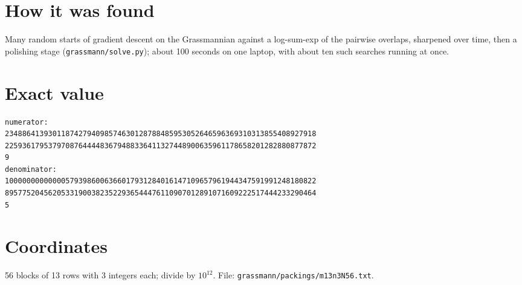 \documentclass[11pt,a4paper]{article}
\begin{document}
\section{How it was found}
Many random starts of gradient descent on the Grassmannian against a log-sum-exp of the pairwise overlaps, sharpened over time, then a polishing stage (\texttt{grassmann/solve.py}); about 100 seconds on one laptop, with about ten such searches running at once.


\appendix
\section{Exact value}
{\small
\begin{verbatim}
numerator:
234886413930118742794098574630128788485953052646596369310313855408927918
225936179537970876444483679488336411327448900635961178658201282880877872
9
denominator:
100000000000005793986006366017931284016147109657961944347591991248180822
895775204562053319003823522936544476110907012891071609222517444233290464
5
\end{verbatim}}

\section{Coordinates}
56 blocks of 13 rows with 3 integers each; divide by $10^{12}$. File: \texttt{grassmann/packings/m13n3N56.txt}.
{\tiny
\begin{multicols}{3}
\end{multicols}}
\end{document}
